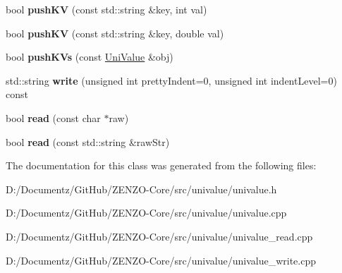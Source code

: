 \begin{DoxyCompactItemize}
\mbox{\label{class_uni_value_a96d764db123ceec6bdbd7bd672e16421}} 
bool {\bfseries push\+KV} (const std\+::string \&key, int val)
\item 
\mbox{\label{class_uni_value_a59d73590cf3deec6c6c4b79282d64dd1}} 
bool {\bfseries push\+KV} (const std\+::string \&key, double val)
\item 
\mbox{\label{class_uni_value_a89821b3f48732c1539e674378cdf7a87}} 
bool {\bfseries push\+K\+Vs} (const \mbox{\hyperlink{class_uni_value}{Uni\+Value}} \&obj)
\item 
\mbox{\label{class_uni_value_a8055f724aa8d0d33fa0467128922a75d}} 
std\+::string {\bfseries write} (unsigned int pretty\+Indent=0, unsigned int indent\+Level=0) const
\item 
\mbox{\label{class_uni_value_a7a2b0e2861c456dc4966e5793453736d}} 
bool {\bfseries read} (const char $\ast$raw)
\item 
\mbox{\label{class_uni_value_aedc51fc46ef1c5c3e60bf1a9219bbdc8}} 
bool {\bfseries read} (const std\+::string \&raw\+Str)
\end{DoxyCompactItemize}


The documentation for this class was generated from the following files\+:\begin{DoxyCompactItemize}
\item 
D\+:/\+Documentz/\+Git\+Hub/\+Z\+E\+N\+Z\+O-\/\+Core/src/univalue/univalue.\+h\item 
D\+:/\+Documentz/\+Git\+Hub/\+Z\+E\+N\+Z\+O-\/\+Core/src/univalue/univalue.\+cpp\item 
D\+:/\+Documentz/\+Git\+Hub/\+Z\+E\+N\+Z\+O-\/\+Core/src/univalue/univalue\+\_\+read.\+cpp\item 
D\+:/\+Documentz/\+Git\+Hub/\+Z\+E\+N\+Z\+O-\/\+Core/src/univalue/univalue\+\_\+write.\+cpp\end{DoxyCompactItemize}
